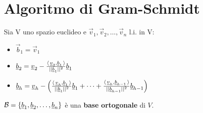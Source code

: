 \section{Algoritmo di Gram-Schmidt}

Sia V uno spazio euclideo e $\vec{v}_1, \vec{v}_2, \dots, \vec{v}_n$ l.i. in V:
\begin{itemize}
	\item $\vec{b}_1 = \vec{v}_1$
	\item $\underline{b}_2 = \underline{v}_2 - \frac{\langle\,\underline{v}_2,\underline{b}_1\,\rangle}{||\underline{b}_1||^2}\underline{b}_1$
	\item $\underline{b}_h = \underline{v}_h - \left(
		\frac{\langle\,\underline{v}_h,\underline{b}_1\,\rangle}{||\underline{b}_1||^2}\underline{b}_1 +
		\cdots +
		\frac{\langle\,\underline{v}_h,\underline{b}_{h-1}\,\rangle}{||\underline{b}_{h-1}||^2}\underline{b}_{h-1}
	\right)$
\end{itemize}

$\mathcal{B} = \{\underline{b}_1, \underline{b}_2, \dots, \underline{b}_n\}$ è una \textbf{base ortogonale} di $V$.
